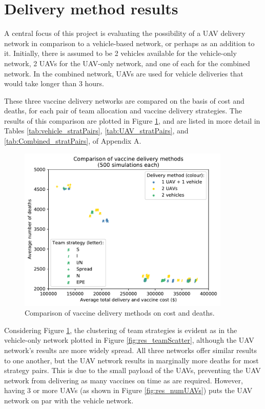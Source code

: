 \section{Delivery method results}
\label{sec:res_delMethRes}
A central focus of this project is evaluating the possibility of a UAV delivery network in comparison to a vehicle-based network, or perhaps as an addition to it. Initially, there is assumed to be 2 vehicles available for the vehicle-only network, 2 UAVs for the UAV-only network, and one of each for the combined network. In the combined network, UAVs are used for vehicle deliveries that would take longer than 3 hours.

These three vaccine delivery networks are compared on the basis of cost and deaths, for each pair of team allocation and vaccine delivery strategies. The results of this comparison are plotted in Figure \ref{fig:res_delMethods}, and are listed in more detail in Tables \ref{tab:vehicle_stratPairs}, \ref{tab:UAV_stratPairs}, and \ref{tab:Combined_stratPairs}, of Appendix A.

\begin{figure}[ht!]
    \centering
    \includegraphics[width=0.9\textwidth, trim={0 0 0 1.15cm}, clip]{Figures/delivMethodScatter.pdf}
    \caption{Comparison of vaccine delivery methods on cost and deaths.}
    \label{fig:res_delMethods}
\end{figure}

Considering Figure \ref{fig:res_delMethods}, the clustering of team strategies is evident as in the vehicle-only network plotted in Figure \ref{fig:res_teamScatter}, although the UAV network's results are more widely spread. All three networks offer similar results to one another, but the UAV network results in marginally more deaths for most strategy pairs. This is due to the small payload of the UAVs, preventing the UAV network from delivering as many vaccines on time as are required. However, having 3 or more UAVs (as shown in Figure \ref{fig:res_numUAVs}) puts the UAV network on par with the vehicle network. 

